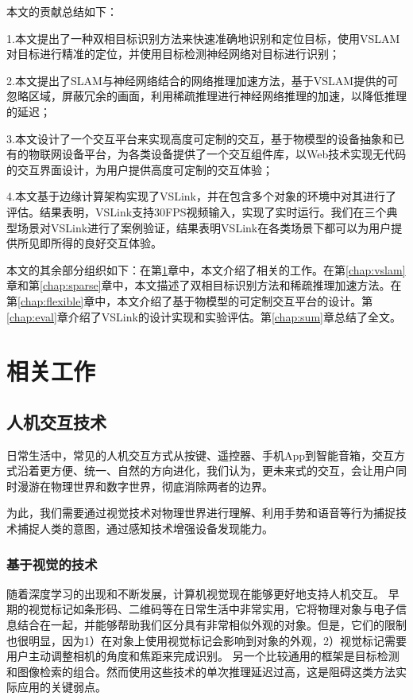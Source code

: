 本文的贡献总结如下：

1.本文提出了一种双相目标识别方法来快速准确地识别和定位目标，使用VSLAM对目标进行精准的定位，并使用目标检测神经网络对目标进行识别；

2.本文提出了SLAM与神经网络结合的网络推理加速方法，基于VSLAM提供的可忽略区域，屏蔽冗余的画面，利用稀疏推理进行神经网络推理的加速，以降低推理的延迟；

3.本文设计了一个交互平台来实现高度可定制的交互，基于物模型的设备抽象和已有的物联网设备平台，为各类设备提供了一个交互组件库，以Web技术实现无代码的交互界面设计，为用户提供高度可定制的交互体验；

4.本文基于边缘计算架构实现了VSLink，并在包含多个对象的环境中对其进行了评估。结果表明，VSLink支持30FPS视频输入，实现了实时运行。我们在三个典型场景对VSLink进行了案例验证，结果表明VSLink在各类场景下都可以为用户提供所见即所得的良好交互体验。

本文的其余部分组织如下：在第\ref{chap:related}章中，本文介绍了相关的工作。在第\ref{chap:vslam}章和第\ref{chap:sparse}章中，本文描述了双相目标识别方法和稀疏推理加速方法。在第\ref{chap:flexible}章中，本文介绍了基于物模型的可定制交互平台的设计。第\ref{chap:eval}章介绍了VSLink的设计实现和实验评估。第\ref{chap:sum}章总结了全文。



\chapter{相关工作}
\label{chap:related}
\section{人机交互技术}
日常生活中，常见的人机交互方式从按键、遥控器、手机App到智能音箱，交互方式沿着更方便、统一、自然的方向进化，我们认为，更未来式的交互，会让用户同时漫游在物理世界和数字世界，彻底消除两者的边界。

为此，我们需要通过视觉技术对物理世界进行理解、利用手势和语音等行为捕捉技术捕捉人类的意图，通过感知技术增强设备发现能力。

\subsection{基于视觉的技术}
随着深度学习的出现和不断发展，计算机视觉现在能够更好地支持人机交互。
早期的视觉标记\cite{wang2010design,olson2011apriltag}如条形码、二维码等在日常生活中非常实用，它将物理对象与电子信息结合在一起，并能够帮助我们区分具有非常相似外观的对象。但是，它们的限制也很明显，因为1）在对象上使用视觉标记会影响到对象的外观，2）视觉标记需要用户主动调整相机的角度和焦距来完成识别。
另一个比较通用的框架是目标检测\cite{ren2015faster,redmon2018yolov3,qin2019thundernet}和图像检索\cite{philbin2008lost,zheng2017sift}的组合。然而使用这些技术的单次推理延迟过高，这是阻碍这类方法实际应用的关键弱点。

